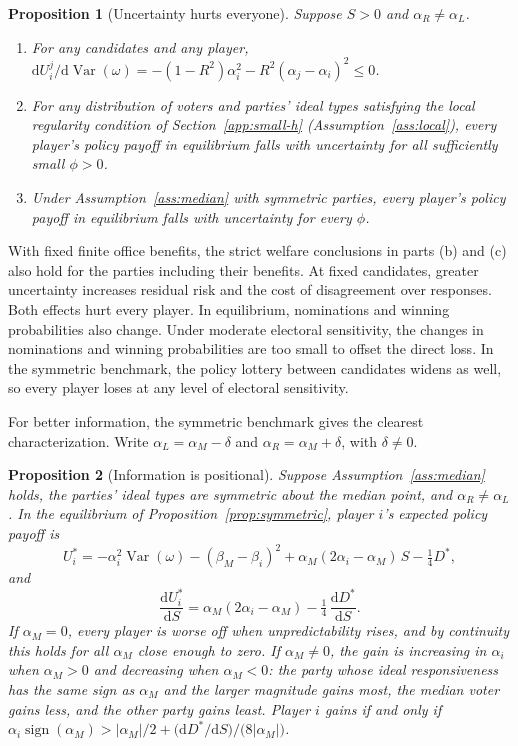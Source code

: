 \documentclass[12pt,letterpaper]{article}
\newtheorem{proposition}{Proposition}
\begin{document}
\begin{proposition}[Uncertainty hurts everyone]\label{prop:welfare-unc}
Suppose $S>0$ and $\alpha_R\ne\alpha_L$.
\begin{enumerate}
  \item[(a)] For any candidates and any player, $\mathrm{d}U_i^j/\mathrm{d}\operatorname{Var}(\omega)=-(1-R^2)\alpha_i^2-R^2(\alpha_j-\alpha_i)^2\le0$.
  \item[(b)] For any distribution of voters and parties' ideal types satisfying the local regularity condition of Section~\ref{app:small-h} (Assumption~\ref{ass:local}), every player's policy payoff in equilibrium falls with uncertainty for all sufficiently small $\phi>0$.
  \item[(c)] Under Assumption~\ref{ass:median} with symmetric parties, every player's policy payoff in equilibrium falls with uncertainty for every $\phi$.
\end{enumerate}
\end{proposition}

With fixed finite office benefits, the strict welfare conclusions in parts (b) and (c) also hold for the parties including their benefits. At fixed candidates, greater uncertainty increases residual risk and the cost of disagreement over responses. Both effects hurt every player. In equilibrium, nominations and winning probabilities also change. Under moderate electoral sensitivity, the changes in nominations and winning probabilities are too small to offset the direct loss. In the symmetric benchmark, the policy lottery between candidates widens as well, so every player loses at any level of electoral sensitivity.

For better information, the symmetric benchmark gives the clearest characterization. Write $\alpha_L=\alpha_M-\delta$ and $\alpha_R=\alpha_M+\delta$, with $\delta\ne0$.

\begin{proposition}[Information is positional]\label{prop:welfare}
Suppose Assumption~\ref{ass:median} holds, the parties' ideal types are symmetric about the median point, and $\alpha_R\ne\alpha_L$. In the equilibrium of Proposition~\ref{prop:symmetric}, player $i$'s expected policy payoff is
\[
U_i^*=-\alpha_i^2\operatorname{Var}(\omega)-(\beta_M-\beta_i)^2+\alpha_M(2\alpha_i-\alpha_M)\,S-\tfrac14D^*,
\]
and
\[
\frac{\mathrm{d}U_i^*}{\mathrm{d}S}=\alpha_M(2\alpha_i-\alpha_M)-\tfrac14\,\frac{\mathrm{d}D^*}{\mathrm{d}S}.
\]
If $\alpha_M=0$, every player is worse off when unpredictability rises, and by continuity this holds for all $\alpha_M$ close enough to zero. If $\alpha_M\ne0$, the gain is increasing in $\alpha_i$ when $\alpha_M>0$ and decreasing when $\alpha_M<0$: the party whose ideal responsiveness has the same sign as $\alpha_M$ and the larger magnitude gains most, the median voter gains less, and the other party gains least. Player $i$ gains if and only if $\alpha_i\operatorname{sign}(\alpha_M)>|\alpha_M|/2+\big(\mathrm{d}D^*/\mathrm{d}S\big)/\big(8|\alpha_M|\big)$.
\end{proposition}
\end{document}
